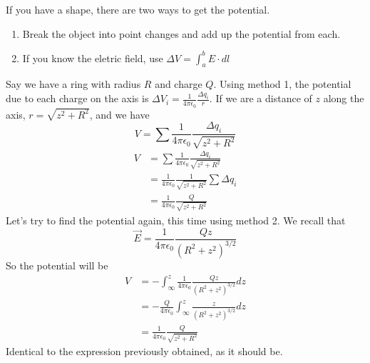 \documentclass[nobib]{tufte-handout}
\begin{document}
If you have a shape, there are two ways to get the potential. 
\begin{enumerate}
    \item Break the object into point changes and add up the potential from each. 
    \item If you know the eletric field, use $\Delta V = \int_{a}^{b} E \cdot dl$
\end{enumerate}
Say we have a ring with radius $R$ and charge $Q$. Using method 1, the potential due 
to each charge on the axis is $\Delta V_i = \frac{1}{4\pi \epsilon_0}\frac{\Delta q_i}{r}$.
If we are a distance of $z$ along the axis, $r = \sqrt{z^2+R^2}$, and we have 
\[V = \sum \frac{1}{4 \pi \epsilon_0}\frac{\Delta q_i}{\sqrt{z^2+R^2}}\]
\begin{align*}
    V &= \sum \frac{1}{4 \pi \epsilon_0}\frac{\Delta q_i}{\sqrt{z^2+R^2}} \\
    &= \frac{1}{4 \pi \epsilon_0}\frac{1}{\sqrt{z^2+R^2}} \sum \Delta q_i \\
    &= \frac{1}{4 \pi \epsilon_0}\frac{Q}{\sqrt{z^2+R^2}}
\end{align*}
Let's try to find the potential again, this time using method 2. 
We recall that 
\[\vec{E} = \frac{1}{4 \pi \epsilon_0}\frac{Qz}{(R^2+z^2)^{3/2}}\]
So the potential will be 
\begin{align*}
    V &= -\int_{\infty}^{z} \frac{1}{4 \pi \epsilon_0}\frac{Qz}{(R^2+z^2)^{3/2}} dz \\
    &= - \frac{Q}{4 \pi \epsilon_0}\int_{\infty}^{z}\frac{z}{(R^2+z^2)^{3/2}} dz \\
    &= \frac{1}{4 \pi \epsilon_0}\frac{Q}{\sqrt{z^2+R^2}}
\end{align*}
Identical to the expression previously obtained, as it should be.
\end{document}
